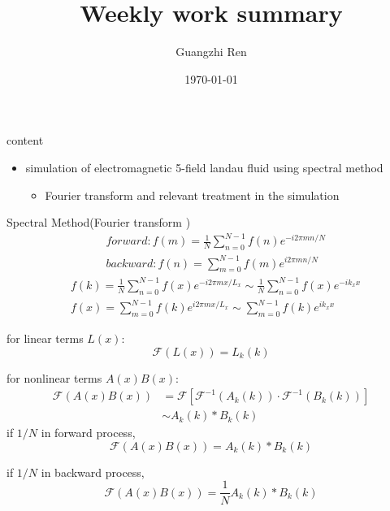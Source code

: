 \documentclass{beamer}
\title{Weekly work summary}
\author{Guangzhi Ren}
\institute {}
\date{\today}
\begin{document}
	
\begin{frame}
	\titlepage   
\end{frame}


\begin{frame}{content}
\begin{itemize}
	\item simulation of electromagnetic 5-field landau fluid using spectral method
	\begin{itemize}
		\item Fourier transform and relevant treatment in the simulation 
	\end{itemize}
\end{itemize}
\end{frame}
%


\begin{frame}{Spectral Method(Fourier transform )}
	\begin{equation}
		\begin{aligned}
			& forward: f(m) = \frac{1}{N}\sum_{n=0}^{N-1}f(n)e^{-i2\pi{m}n/N}	\\
			& backward: f(n) = \sum_{m=0}^{N-1}f(m)e^{i2\pi{m}n/N}
		\end{aligned}
	\end{equation}
	\begin{equation}
		\begin{aligned}
			& f(k) = \frac{1}{N}\sum_{n=0}^{N-1}f(x)e^{-i2\pi{m}x/L_x}
			\sim\frac{1}{N}\sum_{n=0}^{N-1}f(x)e^{-ik_xx}	\\
			& f(x) = \sum_{m=0}^{N-1}f(k)e^{i2\pi{m}x/L_x}
			\sim\sum_{m=0}^{N-1}f(k)e^{ik_xx}
		\end{aligned}
	\end{equation}
\end{frame}

\begin{frame}
	for linear terms $L(x)$:
	\begin{equation}
		\mathcal{F}(L(x))= L_k(k)
	\end{equation}
	
	for nonlinear terms $A(x)B(x)$:
	\begin{equation}
		\begin{aligned}
			\mathcal{F}(A(x)B(x))
			&=\mathcal{F}[\mathcal{F}^{-1}(A_k(k))\cdot\mathcal{F}^{-1}(B_k(k))]	\\
			&\sim A_k(k)\ast B_k(k)
		\end{aligned}
	\end{equation}
	if $1/N$ in forward process, $$\mathcal{F}(A(x)B(x))= A_k(k)\ast B_k(k)$$
	
	if $1/N$ in backward process, $$\mathcal{F}(A(x)B(x))= \frac{1}{N}A_k(k)\ast B_k(k)$$
\end{frame}
\end{document}
